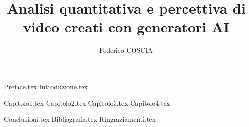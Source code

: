 \documentclass[a4paper,12pt]{report}
\begin{document}
\title{Analisi quantitativa e percettiva di video creati con generatori AI}
\author{Federico COSCIA}

{Preface.tex}
{Introduzione.tex}

{Capitolo1.tex}
{Capitolo2.tex}
{Capitolo3.tex}
{Capitolo4.tex}

{Conclusioni.tex}
{Bibliografia.tex}
{Ringraziamenti.tex}
\end{document}
